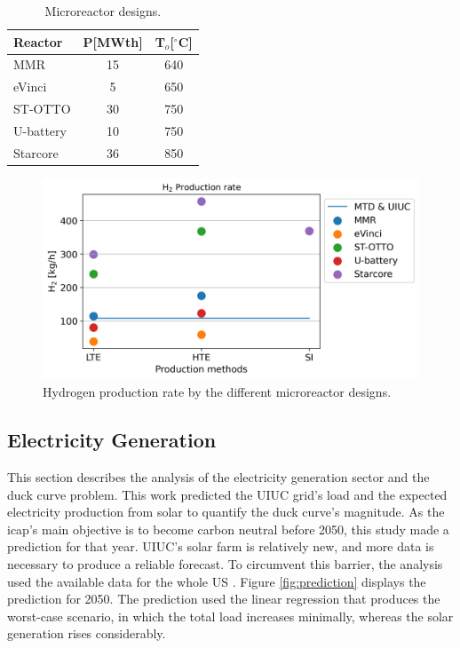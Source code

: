 	\begin{table}[htbp!]
		\centering
	    \caption{Microreactor designs.}
		\begin{tabular}{lcc}
		\toprule
		Reactor                                      & P[MWth] & T$_o$[$^\circ$C] \\
		\midrule
		MMR \cite{usnc_mmr_2019}  		             & 15      & 640              \\
		eVinci \cite{hernandez_micro_2019}           & 5       & 650              \\
		ST-OTTO \cite{harlan_x-energy_2018}          & 30      & 750              \\
		U-battery \cite{ding_design_2011}            & 10      & 750              \\
		Starcore \cite{star_core_nuclear_star_2015}  & 36      & 850              \\
		\toprule
        \end{tabular}
        \label{tab:hydro-micro}
	\end{table}

	\begin{figure}[htbp!]
	    \centering
		\includegraphics[height=6.0cm]{figures-hydro/reactors-by-hour1}
		\hfill
		\caption{Hydrogen production rate by the different microreactor designs.}
		\label{fig:hydro-micro}
	\end{figure}

\subsection{Electricity Generation}
\label{sec:results-electric}

This section describes the analysis of the electricity generation sector and the duck curve problem.
This work predicted the UIUC grid’s load and the expected electricity production from solar to quantify the duck curve’s magnitude.
As the \gls{icap}'s main objective is to become carbon neutral before 2050, this study made a prediction for that year.
UIUC's solar farm is relatively new, and more data is necessary to produce a reliable forecast.
To circumvent this barrier, the analysis used the available data for the whole \gls{US} \cite{us_energy_information_administration_electric_2020}.
Figure \ref{fig:prediction} displays the prediction for 2050.
The prediction used the linear regression that produces the worst-case scenario, in which the total load increases minimally, whereas the solar generation rises considerably.

